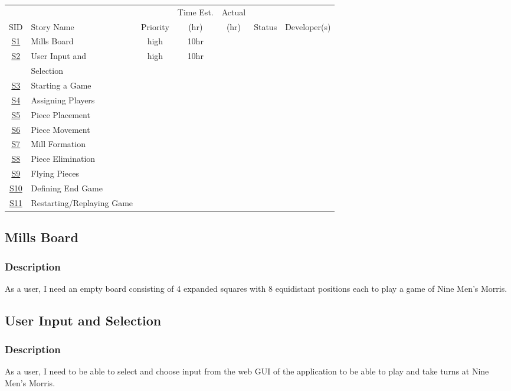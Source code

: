 \documentclass[11pt]{article}
\begin{document}
\begin{center}
\begin{tabular}{|c|m{3.5cm}|c|c|c|c|c|}
 &  &  & Time Est. & Actual &  & \\
SID & Story Name & Priority & (hr) & (hr) & Status & Developer(s)\\
\hline
\hyperref[sec:org26ef080]{S1} & Mills Board & high & 10hr &  &  & \\
\hline
\hyperref[sec:org0164a07]{S2} & User Input and & high & 10hr &  &  & \\
 & Selection &  &  &  &  & \\
\hline
\hyperref[sec:org36cf713]{S3} & Starting a Game &  &  &  &  & \\
\hline
\hyperref[sec:org5de048f]{S4} & Assigning Players &  &  &  &  & \\
\hline
\hyperref[sec:org224bd66]{S5} & Piece Placement &  &  &  &  & \\
\hline
\hyperref[sec:org896f644]{S6} & Piece Movement &  &  &  &  & \\
\hline
\hyperref[sec:orgdd62d75]{S7} & Mill Formation &  &  &  &  & \\
\hline
\hyperref[sec:orgb0bd3e8]{S8} & Piece Elimination &  &  &  &  & \\
\hline
\hyperref[sec:org270d580]{S9} & Flying Pieces &  &  &  &  & \\
\hline
\hyperref[sec:org61ed46a]{S10} & Defining End Game &  &  &  &  & \\
\hline
\hyperref[sec:org9b963e0]{S11} & Restarting/Replaying Game &  &  &  &  & \\
\end{tabular}
\end{center}


\subsection{Mills Board}
\label{sec:org26ef080}
\subsubsection*{Description}
\label{sec:org5abc2c3}
As a user, I need an empty board consisting of 4 expanded squares with 8 equidistant positions
each to play a game of Nine Men's Morris.
\subsection{User Input and Selection}
\label{sec:org0164a07}
\subsubsection*{Description}
\label{sec:org42567f0}
As a user, I need to be able to select and choose input from the web GUI of the application to
be able to play and take turns at Nine Men's Morris.
\end{document}

